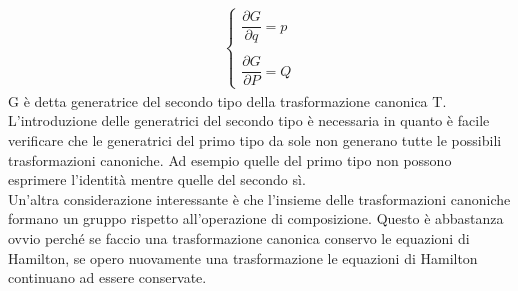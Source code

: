 \documentclass[
10pt, %
a4paper, %
oneside, %
headinclude,footinclude, %
BCOR5mm, %
]{scrartcl}
\begin{document}
\begin{align*}
	\begin{cases}
		\dfrac{\partial G}{\partial q} = p\\\\
		\dfrac{\partial G}{\partial P} = Q
	\end{cases}
\end{align*}
G è detta generatrice del secondo tipo della trasformazione canonica T.\\
 L'introduzione delle generatrici del secondo tipo è necessaria in quanto è facile verificare che le generatrici del primo tipo da sole non generano tutte le possibili trasformazioni canoniche. Ad esempio quelle del primo tipo non possono esprimere l'identità mentre quelle del secondo sì.\\
Un'altra considerazione interessante è che l'insieme delle trasformazioni canoniche formano un gruppo rispetto all'operazione di composizione. Questo è abbastanza ovvio perché se faccio una trasformazione canonica conservo le equazioni di Hamilton, se opero nuovamente una trasformazione le equazioni di Hamilton continuano ad essere conservate.
\end{document}
